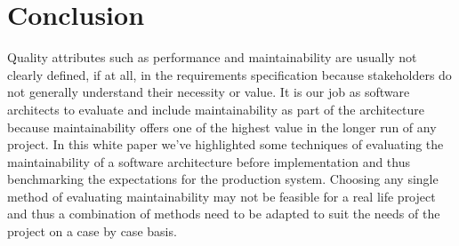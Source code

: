 \documentclass[15pt]{article}
\begin{document}
\section{Conclusion}
Quality attributes such as performance and maintainability are usually not clearly defined, if at all, in the requirements specification because stakeholders do not generally understand their necessity or value. It is our job as software architects to evaluate and include maintainability as part of the architecture because maintainability offers one of the highest value in the longer run of any project. In this white paper we've highlighted some techniques of evaluating the maintainability of a software architecture before implementation and thus benchmarking the expectations for the production system. Choosing any single method of evaluating maintainability may not be feasible for a real life project and thus a combination of methods need to be adapted to suit the needs of the project on a case by case basis.




\newpage


\end{document}
